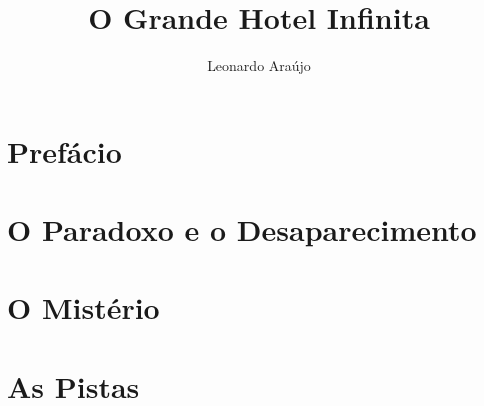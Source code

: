 \documentclass[twoside,openany]{book} %
\title{O Grande Hotel Infinita}
\author{Leonardo Araújo}
\date{}
\begin{document}
\thispagestyle{empty}


\clearpage
\thispagestyle{empty} %
\mbox{} 
\clearpage

{} %
\setcounter{page}{1}
\maketitle
\thispagestyle{empty}



\Large
\tableofcontents %

\clearpage
\thispagestyle{fancy}

\clearpage 
\chapter*{Prefácio} %



\clearpage

\clearpage
\chapter{O Paradoxo e o Desaparecimento}


\clearpage

\clearpage
\chapter{O Mistério}


\clearpage

\clearpage
\chapter{As Pistas}

\end{document}
